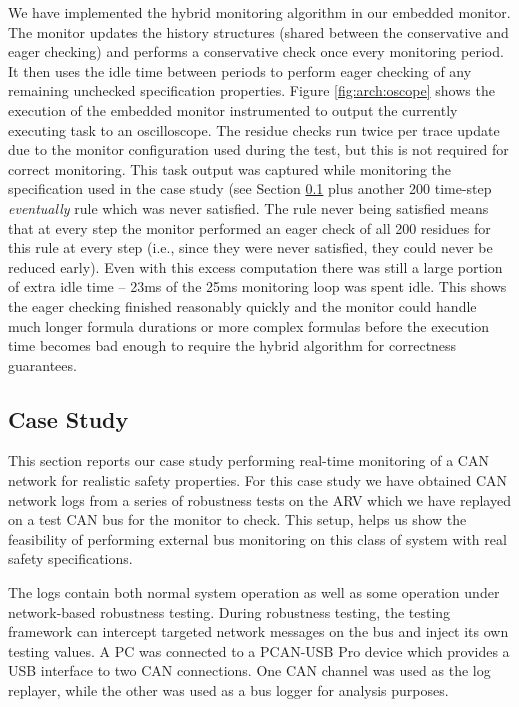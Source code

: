 We have implemented the hybrid monitoring algorithm in our embedded monitor. The monitor updates the history structures (shared between the conservative and eager checking) and performs a conservative check once every monitoring period. It then uses the idle time between periods to perform eager checking of any remaining unchecked specification properties.
%
Figure \ref{fig:arch:oscope} shows the execution of the embedded monitor instrumented to output the currently executing task to an oscilloscope. The residue checks run twice per trace update due to the monitor configuration used during the test, but this is not required for correct monitoring.
This task output was captured while monitoring the specification used in the case study (see Section \ref{sec:case_study} plus another 200 time-step \emph{eventually} rule which was never satisfied. 
The rule never being satisfied means that at every step the monitor performed an eager check of all 200 residues for this rule at every step (i.e., since they were never satisfied, they could never be reduced early). 
Even with this excess computation there was still a large portion of extra idle time -- 23ms of the 25ms monitoring loop was spent idle. 
This shows the eager checking finished reasonably quickly and the monitor could handle much longer formula durations or more complex formulas before the execution time becomes bad enough to require the hybrid algorithm for correctness guarantees. 

\subsection{Case Study}
\label{sec:case_study}
This section reports our case study performing real-time monitoring of a CAN network for realistic safety properties. 
For this case study we have obtained CAN network logs from a series of robustness tests on the ARV which we have replayed on a test CAN bus for the monitor to check. 
This setup, %
helps us show the feasibility of performing external bus monitoring on this class of system with real safety specifications.


The logs contain both normal system operation as well as some operation under network-based robustness testing. During robustness testing, the testing framework can intercept targeted network messages on the bus and inject its own testing values. %
A PC was connected to a PCAN-USB Pro \cite{PCAN-USBPro} device which provides a USB interface to two CAN connections. One CAN channel was used as the log replayer, while the other was used as a bus logger for analysis purposes.

